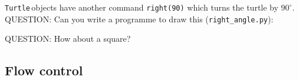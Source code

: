 \documentclass[11pt,a4paper]{scrartcl}
\newcommand{\turtle}{\texttt{Turtle}\,}
\begin{document}
\turtle objects have another command \texttt{right(90)} which turns the turtle by $90^\circ$. QUESTION: Can you write a programme to draw this (\texttt{right\_angle.py}):
\begin{center}
\end{center}
QUESTION: How about a square?
\begin{center}
\end{center}

\subsection*{Flow control}
\end{document}
